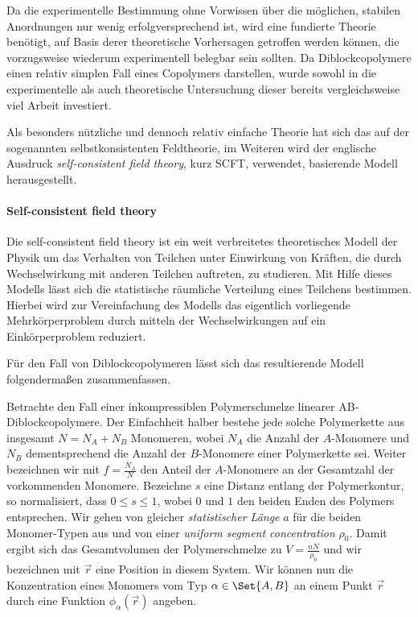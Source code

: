Da die experimentelle Bestimmung ohne Vorwissen über die möglichen, stabilen Anordnungen nur wenig erfolgversprechend ist, wird eine fundierte Theorie benötigt, auf Basis derer theoretische Vorhersagen getroffen werden können, die vorzugsweise wiederum experimentell belegbar sein sollten.
Da Diblockcopolymere einen relativ simplen Fall eines Copolymers darstellen, wurde sowohl in die experimentelle als auch theoretische Untersuchung dieser bereits vergleichsweise viel Arbeit investiert.

Als besonders nützliche und dennoch relativ einfache Theorie hat sich das auf der sogenannten selbstkonsistenten Feldtheorie, im Weiteren wird der englische Ausdruck \emph{self-consistent field theory}, kurz SCFT, verwendet, basierende Modell herausgestellt.

\paragraph{Self-consistent field theory} %
\label{par:self_consistent_field_theory}

Die self-consistent field theory ist ein weit verbreitetes theoretisches Modell der Physik um das Verhalten von Teilchen unter Einwirkung von Kräften, die durch Wechselwirkung mit anderen Teilchen auftreten, zu studieren.
Mit Hilfe dieses Modells lässt sich die statistische räumliche Verteilung eines Teilchens bestimmen.
Hierbei wird zur Vereinfachung des Modells das eigentlich vorliegende Mehrkörperproblem durch mitteln der Wechselwirkungen auf ein Einkörperproblem reduziert.

Für den Fall von Diblockcopolymeren lässt sich das resultierende Modell folgendermaßen zusammenfassen.

Betrachte den Fall einer inkompressiblen Polymerschmelze linearer AB-Diblockcopolymere.
Der Einfachheit halber bestehe jede solche Polymerkette aus insgesamt $N = N_{A} + N_{B}$ Monomeren, wobei $N_{A}$ die Anzahl der $A$-Monomere und $N_{B}$ dementsprechend die Anzahl der $B$-Monomere einer Polymerkette sei.
Weiter bezeichnen wir mit $f = \frac{N_{A}}{N}$ den Anteil der $A$-Monomere an der Gesamtzahl der vorkommenden Monomere.
Bezeichne $s$ eine Distanz entlang der Polymerkontur, so normalisiert, dass $0 \leq s \leq 1$, wobei $0$ und $1$ den beiden Enden des Polymers entsprechen.
Wir gehen von gleicher \emph{statistischer Länge} $a$ für die beiden Monomer-Typen aus und von einer \emph{uniform segment concentration} $\rho_{0}$.
Damit ergibt sich das Gesamtvolumen der Polymerschmelze zu $V = \frac{nN}{\rho_{0}}$ und wir bezeichnen mit $\vec{r}$ eine Position in diesem System.
Wir können nun die Konzentration eines Monomers vom Typ $\alpha \in \Set{A, B}$ an einem Punkt $\vec{r}$ durch eine Funktion $\phi_{\alpha}(\vec{r})$ angeben.

